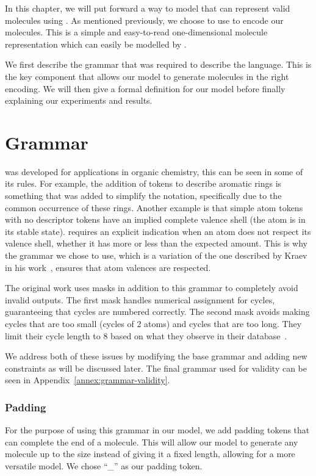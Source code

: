 \documentclass[../Document.tex]{subfiles}
\begin{document}
\label{chap:cp-validity}

In this chapter, we will put forward a way to model that can represent valid molecules using \cp.
As mentioned previously, we choose to use \smiles to encode our molecules. This is a simple and easy-to-read one-dimensional molecule representation which can easily be modelled by \cp.

We first describe the grammar that was required to describe the \smiles language. This is the key component that allows our model to generate molecules in the right encoding. We will then give a formal definition for our model before finally explaining our experiments and results.


\section{\smiles Grammar}
\label{sec:smiles-valid-grammar}
\smiles was developed for applications in organic chemistry, this can be seen in some of its rules. For example, the addition of tokens to describe aromatic rings is something that was added to simplify the notation, specifically due to the common occurrence of these rings. Another example is that simple atom tokens with no descriptor tokens have an implied complete valence shell (\ie the atom is in its stable state). \smiles requires an explicit indication when an atom does not respect its valence shell, whether it has more or less than the expected amount. This is why the grammar we chose to use, which is a variation of the one described by Kraev in his work~\cite{kraev2018grammars}, ensures that atom valences are respected.

The original work uses masks in addition to this grammar to completely avoid invalid outputs.
The first mask handles numerical assignment for cycles, guaranteeing that cycles are numbered correctly.
The second mask avoids making cycles that are too small (\ie cycles of 2 atoms) and cycles that are too long. They limit their cycle length to 8 based on what they observe in their database~\cite{kraev2018grammars}.

We address both of these issues by modifying the base grammar and adding new constraints as will be discussed later. The final grammar used for validity can be seen in Appendix~\ref{annex:grammar-validity}.

\subsubsection{Padding}
For the purpose of using this grammar in our \cp model, we add padding tokens that can complete the end of a molecule. 
This will allow our model to generate any molecule up to the size instead of giving it a fixed length, allowing for a more versatile model.
We chose ``\_'' as our padding token.
\end{document}

